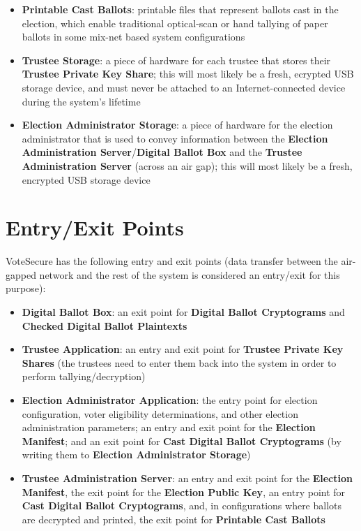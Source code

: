 \documentclass[10pt,letterpaper]{article}
\begin{document}
\begin{itemize}
    \item \textbf{Printable Cast Ballots}: printable files that represent ballots cast in the election, which enable traditional optical-scan or hand tallying of paper ballots in some mix-net based system configurations

    \item \textbf{Trustee Storage}: a piece of hardware for each trustee that stores their \textbf{Trustee Private Key Share}; this will most likely be a fresh, ecrypted USB storage device, and must never be attached to an Internet-connected device during the system's lifetime

    \item \textbf{Election Administrator Storage}: a piece of hardware for the election administrator that is used to convey information between the \textbf{Election Administration Server}/\textbf{Digital Ballot Box} and the \textbf{Trustee Administration Server} (across an air gap); this will most likely be a fresh, encrypted USB storage device

\end{itemize}

\section{Entry/Exit Points}

VoteSecure has the following entry and exit points (data transfer between the air-gapped network and the rest of the system is considered an entry/exit for this purpose):

\begin{itemize}

    \item \textbf{Digital Ballot Box}: an exit point for \textbf{Digital Ballot Cryptograms} and \textbf{Checked Digital Ballot Plaintexts}

    \item \textbf{Trustee Application}: an entry and exit point for \textbf{Trustee Private Key Shares} (the trustees need to enter them back into the system in order to perform tallying/decryption)

    \item \textbf{Election Administrator Application}: the entry point for election configuration, voter eligibility determinations, and other election administration parameters; an entry and exit point for the \textbf{Election Manifest}; and an exit point for \textbf{Cast Digital Ballot Cryptograms} (by writing them to \textbf{Election Administrator Storage})

    \item \textbf{Trustee Administration Server}: an entry and exit point for the \textbf{Election Manifest}, the exit point for the \textbf{Election Public Key}, an entry point for \textbf{Cast Digital Ballot Cryptograms}, and, in configurations where ballots are decrypted and printed, the exit point for \textbf{Printable Cast Ballots}

\end{itemize}
\end{document}
